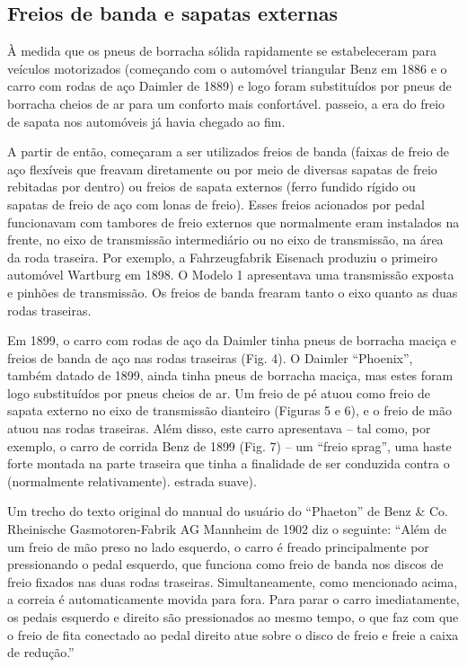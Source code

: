 \subsection{Freios de banda e sapatas externas }

À medida que os pneus de borracha sólida rapidamente se estabeleceram para veículos motorizados (começando com o automóvel triangular Benz em 1886 e o carro com rodas de aço Daimler de 1889) e logo foram substituídos por pneus de borracha cheios de ar para um conforto mais confortável. passeio, a era do freio de sapata nos automóveis já havia chegado ao fim. 

A partir de então, começaram a ser utilizados freios de banda (faixas de freio de aço flexíveis que freavam diretamente ou por meio de diversas sapatas de freio rebitadas por dentro) ou freios de sapata externos (ferro fundido rígido ou sapatas de freio de aço com lonas de freio). Esses freios acionados por pedal funcionavam com tambores de freio externos que normalmente eram instalados na frente, no eixo de transmissão intermediário ou no eixo de transmissão, na área da roda traseira. Por exemplo, a Fahrzeugfabrik Eisenach produziu o primeiro automóvel Wartburg em 1898. O Modelo 1 apresentava uma transmissão exposta e pinhões de transmissão. Os freios de banda frearam tanto o eixo quanto as duas rodas traseiras. 

Em 1899, o carro com rodas de aço da Daimler tinha pneus de borracha maciça e freios de banda de aço nas rodas traseiras (Fig. 4). O Daimler “Phoenix”, também datado de 1899, ainda tinha pneus de borracha maciça, mas estes foram logo substituídos por pneus cheios de ar. Um freio de pé atuou como freio de sapata externo no eixo de transmissão dianteiro (Figuras 5 e 6), e o freio de mão atuou nas rodas traseiras. Além disso, este carro apresentava – tal como, por exemplo, o carro de corrida Benz de 1899 (Fig. 7) – um “freio sprag”, uma haste forte montada na parte traseira que tinha a finalidade de ser conduzida contra o (normalmente relativamente). estrada suave). 

Um trecho do texto original do manual do usuário do “Phaeton” de Benz \& Co. Rheinische Gasmotoren-Fabrik AG Mannheim de 1902 diz o seguinte: “Além de um freio de mão preso no lado esquerdo, o carro é freado principalmente por pressionando o pedal esquerdo, que funciona como freio de banda nos discos de freio fixados nas duas rodas traseiras. Simultaneamente, como mencionado acima, a correia é automaticamente movida para fora. Para parar o carro imediatamente, os pedais esquerdo e direito são pressionados ao mesmo tempo, o que faz com que o freio de fita conectado ao pedal direito atue sobre o disco de freio e freie a caixa de redução.”

